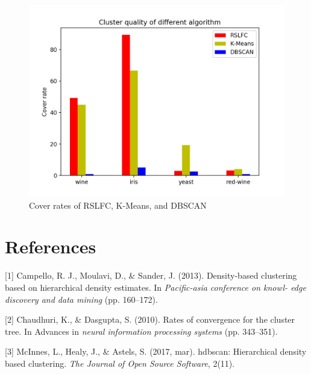 \documentclass{article}
\begin{document}
	\begin{center}
		
	\end{center}
	
	\begin{figure}[h!]
		\centering
		\includegraphics[scale=0.8]{hist1.png}
		\caption{Cover rates of RSLFC, K-Means, and DBSCAN}
	\end{figure}
	
\section*{References}

\small

[1] Campello, R. J., Moulavi, D., \& Sander, J. (2013). Density-based clustering based on hierarchical density estimates. In \emph{Pacific-asia conference on knowl- edge discovery and data mining} (pp. 160–172).

[2] Chaudhuri, K., \& Dasgupta, S. (2010). Rates of convergence for the cluster tree. In Advances in \emph{neural information processing systems} (pp. 343–351).

[3] McInnes, L., Healy, J., \& Astels, S. (2017, mar). hdbscan: Hierarchical density based clustering. \emph{The Journal of Open Source Software}, 2(11).
	
	
\end{document}
